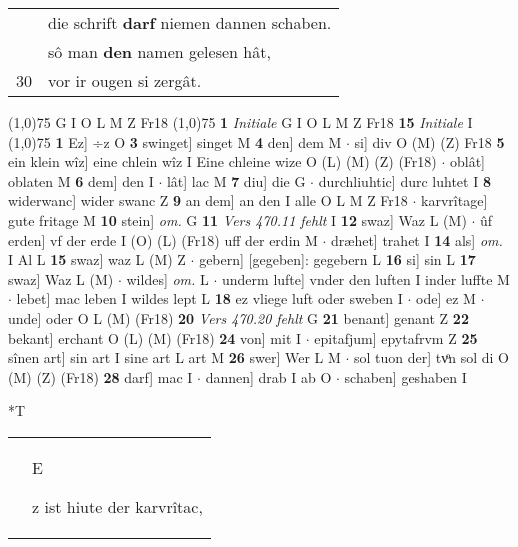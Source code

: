 \documentclass[8pt,a4paper,notitlepage]{article}
\begin{document}
\begin{table}[ht]
\begin{minipage}[t]{0.5\linewidth}
\begin{tabular}{rl}
 & die schrift \textbf{darf} niemen dannen schaben.\\ 
 & sô man \textbf{den} namen gelesen hât,\\ 
30 & vor ir ougen si zergât.\\ 
\end{tabular}
\scriptsize
\line(1,0){75} \newline
G I O L M Z Fr18 \newline
\line(1,0){75} \newline
\textbf{1} \textit{Initiale} G I O L M Z Fr18  \textbf{15} \textit{Initiale} I  \newline
\line(1,0){75} \newline
\textbf{1} Ez] ÷z O \textbf{3} swinget] singet M \textbf{4} den] dem M  $\cdot$ si] div O (M) (Z) Fr18 \textbf{5} ein klein wîz] eine chlein wîz I Eine chleine wize O (L) (M) (Z) (Fr18)  $\cdot$ oblât] oblaten M \textbf{6} dem] den I  $\cdot$ lât] lac M \textbf{7} diu] die G  $\cdot$ durchliuhtic] durc luhtet I \textbf{8} widerwanc] wider swanc Z \textbf{9} an dem] an den I alle O L M Z Fr18  $\cdot$ karvrîtage] gute fritage M \textbf{10} stein] \textit{om.} G \textbf{11} \textit{Vers 470.11 fehlt} I  \textbf{12} swaz] Waz L (M)  $\cdot$ ûf erden] vf der erde I (O) (L) (Fr18) uff der erdin M  $\cdot$ dræhet] trahet I \textbf{14} als] \textit{om.} I Al L \textbf{15} swaz] waz L (M) Z  $\cdot$ gebern] [gegeben]: gegebern L \textbf{16} si] sin L \textbf{17} swaz] Waz L (M)  $\cdot$ wildes] \textit{om.} L  $\cdot$ underm lufte] vnder den luften I inder luffte M  $\cdot$ lebet] mac leben I wildes lept L \textbf{18} ez vliege luft oder sweben I  $\cdot$ ode] ez M  $\cdot$ unde] oder O L (M) (Fr18) \textbf{20} \textit{Vers 470.20 fehlt} G  \textbf{21} benant] genant Z \textbf{22} bekant] erchant O (L) (M) (Fr18) \textbf{24} von] mit I  $\cdot$ epitafjum] epytafrvm Z \textbf{25} sînen art] sin art I sine art L art M \textbf{26} swer] Wer L M  $\cdot$ sol tuon der] tvͦn sol di O (M) (Z) (Fr18) \textbf{28} darf] mac I  $\cdot$ dannen] drab I ab O  $\cdot$ schaben] geshaben I \newline
\end{minipage}
\hspace{0.5cm}
\begin{minipage}[t]{0.5\linewidth}
\small
\begin{center}*T
\end{center}
\begin{tabular}{rl}
 & \begin{large}E\end{large}z ist hiute der karvrîtac,\\ 

\end{tabular}
\end{minipage}
\end{table}
\end{document}
